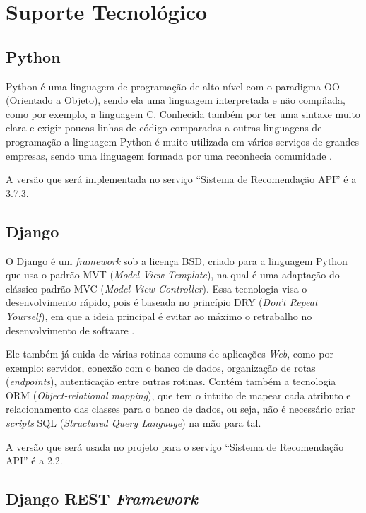 \section{Suporte Tecnológico}

\subsection{Python}

Python é uma linguagem de programação de alto nível com o paradigma OO (Orientado a Objeto), sendo ela uma linguagem interpretada e não compilada, como por exemplo, a linguagem C. Conhecida também por ter uma sintaxe muito clara e exigir poucas linhas de código comparadas a outras linguagens de programação a linguagem Python é muito utilizada em vários serviços de grandes empresas, sendo uma linguagem formada por uma reconhecia comunidade \cite{Python:2019}.

A versão que será implementada no serviço “Sistema de Recomendação API” é a 3.7.3.

\subsection{Django}

O Django é um \textit{framework} sob a licença BSD, criado para a linguagem Python que usa o padrão MVT (\textit{Model-View-Template}), na qual é uma adaptação do clássico padrão MVC (\textit{Model-View-Controller}). Essa tecnologia visa o desenvolvimento rápido, pois é baseada no princípio  DRY (\textit{Don’t Repeat Yourself}), em que a ideia principal é evitar ao máximo o retrabalho no desenvolvimento de software \cite{Django:2019}.

Ele também já cuida de várias rotinas comuns de aplicações \textit{Web}, como por exemplo: servidor, conexão com o banco de dados, organização de rotas (\textit{endpoints}), autenticação entre outras rotinas. Contém também a tecnologia ORM (\textit{Object-relational mapping}), que tem o intuito de mapear cada atributo e relacionamento das classes para o banco de dados, ou seja, não é necessário criar \textit{scripts} SQL (\textit{Structured Query Language}) na mão para tal. 

A versão que será usada no projeto para o serviço “Sistema de Recomendação API” é a 2.2.

\subsection{Django REST \textit{Framework}}


